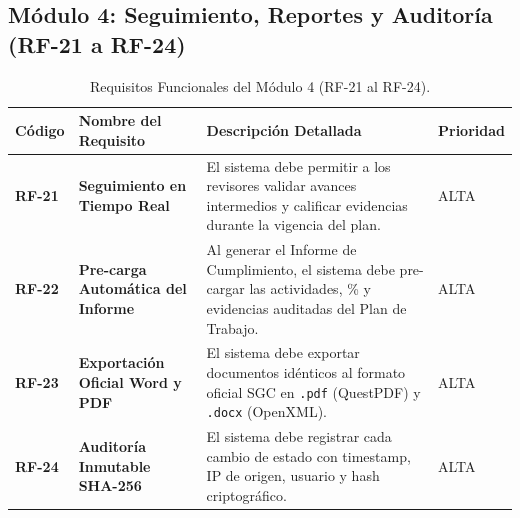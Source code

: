 \documentclass[12pt,a4paper]{article}
\begin{document}
\subsection{Módulo 4: Seguimiento, Reportes y Auditoría (RF-21 a RF-24)}
\begin{table}[htbp]
\centering
\small
\begin{tabularx}{\textwidth}{|>{\hsize=0.35\hsize\bfseries\centering\arraybackslash}X|>{\hsize=0.85\hsize\bfseries}X|>{\hsize=1.5\hsize}X|>{\hsize=0.3\hsize\centering\arraybackslash}X|}
    \hline
    \rowcolor{tableheader}
    Código & Nombre del Requisito & Descripción Detallada & Prioridad \\
    \hline
    RF-21 & Seguimiento en Tiempo Real & El sistema debe permitir a los revisores validar avances intermedios y calificar evidencias durante la vigencia del plan. & ALTA \\
    \hline
    RF-22 & Pre-carga Automática del Informe & Al generar el Informe de Cumplimiento, el sistema debe pre-cargar las actividades, \% y evidencias auditadas del Plan de Trabajo. & ALTA \\
    \hline
    RF-23 & Exportación Oficial Word y PDF & El sistema debe exportar documentos idénticos al formato oficial SGC en \texttt{.pdf} (QuestPDF) y \texttt{.docx} (OpenXML). & ALTA \\
    \hline
    RF-24 & Auditoría Inmutable SHA-256 & El sistema debe registrar cada cambio de estado con timestamp, IP de origen, usuario y hash criptográfico. & ALTA \\
    \hline
\end{tabularx}
\caption{Requisitos Funcionales del Módulo 4 (RF-21 al RF-24).}
\label{tab:s1_03_rf_m4}
\end{table}
\end{document}
